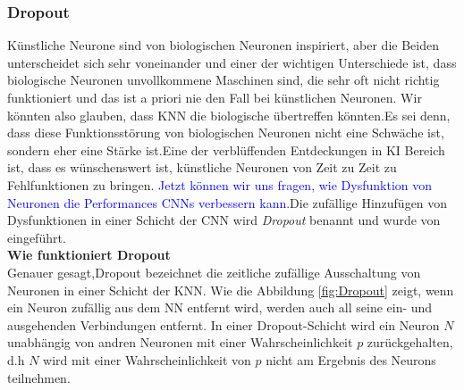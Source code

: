 \documentclass[12pt,a4paper]{scrartcl}
\numberwithin{equation}{section}
\begin{document}
\subsubsection{Dropout}
Künstliche Neurone sind von biologischen Neuronen inspiriert, aber die Beiden unterscheidet sich sehr voneinander und einer der wichtigen Unterschiede ist, dass biologische Neuronen unvollkommene Maschinen sind, die sehr oft nicht richtig funktioniert und das ist a priori nie den Fall bei  künstlichen Neuronen. Wir könnten also glauben, dass \ac{KNN} die biologische übertreffen könnten.Es sei denn, dass diese Funktionsstörung von biologischen Neuronen nicht eine Schwäche ist, sondern eher eine Stärke ist.Eine der verblüffenden Entdeckungen in \ac{KI} Bereich ist, dass es wünschenswert ist, künstliche Neuronen von Zeit zu Zeit zu Fehlfunktionen zu bringen\cite{1}. \textcolor{blue}{Jetzt können wir uns fragen, wie Dysfunktion von Neuronen die Performances \acsp{CNN} verbessern kann}.Die zufällige Hinzufügen von Dysfunktionen in einer Schicht der \ac{CNN} wird \textit{Dropout} benannt und wurde von \cite[Geoffrey E. et al]{2} eingeführt.\\
\textbf{Wie funktioniert Dropout}\\
Genauer gesagt,Dropout bezeichnet die zeitliche zufällige Ausschaltung von Neuronen in einer Schicht der \ac{KNN}. Wie die Abbildung \ref{fig:Dropout} zeigt, wenn ein Neuron zufällig aus dem \ac{NN} entfernt wird, werden auch all seine ein- und ausgehenden Verbindungen entfernt.
In einer Dropout-Schicht wird ein Neuron $ \textit{N} $ unabhängig von andren Neuronen mit einer Wahrscheinlichkeit $ {p} $ zurückgehalten, d.h $ \textit{N} $ wird mit einer Wahrscheinlichkeit von $ {p} $ nicht am Ergebnis des Neurons teilnehmen.
\end{document}
